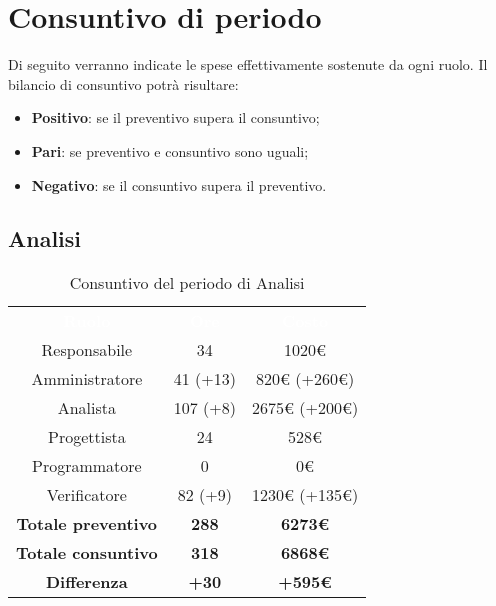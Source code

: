 \section{Consuntivo di periodo}
Di seguito verranno indicate le spese effettivamente sostenute da ogni ruolo. Il bilancio di consuntivo potrà risultare: \begin{itemize}
\item \textbf{Positivo}: se il preventivo supera il consuntivo;
\item \textbf{Pari}: se preventivo e consuntivo sono uguali;
\item \textbf{Negativo}: se il consuntivo supera il preventivo.
\end{itemize}

\subsection{Analisi}
\begin{table}[H]
\centering\renewcommand{\arraystretch}{1.5}
\caption{Consuntivo del periodo di Analisi}
\vspace{0.2cm}
\begin{tabular}{ c c c }
\rowcolor{redafk}
\textcolor{white}{\textbf{Ruolo}} & \textcolor{white}{\textbf{Ore}} & 
\textcolor{white}{\textbf{Costo}}  \\
Responsabile & 34 & 1020€ \\
Amministratore & 41 (+13) & 820€ (+260€) \\
Analista & 107 (+8) & 2675€ (+200€) \\
Progettista	& 24 & 528€  \\
Programmatore & 0 & 0€  \\
Verificatore & 82 (+9) & 1230€ (+135€)  \\
\textbf{Totale preventivo} & \textbf{288} & \textbf{6273€}  \\
\textbf{Totale consuntivo} & \textbf{318} & \textbf{6868€}  \\
\rowcolor{lastrowcolor}
\textbf{Differenza} & \textbf{+30} & \textbf{+595€}  \\
\end{tabular}
\end{table}

